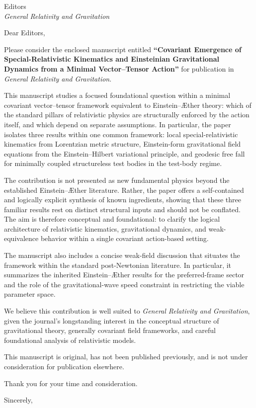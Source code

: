 \documentclass[a4paper,10pt]{letter}
\date{\today}
\begin{document}
    
    \begin{letter}{Editors\\
    \textit{General Relativity and Gravitation}}

        \opening{Dear Editors,}
        
        Please consider the enclosed manuscript entitled
        \textbf{“Covariant Emergence of Special-Relativistic Kinematics and Einsteinian Gravitational Dynamics from a Minimal Vector--Tensor Action”}
        for publication in \textit{General Relativity and Gravitation}.
        
        This manuscript studies a focused foundational question within a minimal covariant vector--tensor framework equivalent to Einstein--\AE{}ther theory: which of the standard pillars of relativistic physics are structurally enforced by the action itself, and which depend on separate assumptions. In particular, the paper isolates three results within one common framework: local special-relativistic kinematics from Lorentzian metric structure, Einstein-form gravitational field equations from the Einstein--Hilbert variational principle, and geodesic free fall for minimally coupled structureless test bodies in the test-body regime.
        
        The contribution is not presented as new fundamental physics beyond the established Einstein--\AE{}ther literature. Rather, the paper offers a self-contained and logically explicit synthesis of known ingredients, showing that these three familiar results rest on distinct structural inputs and should not be conflated. The aim is therefore conceptual and foundational: to clarify the logical architecture of relativistic kinematics, gravitational dynamics, and weak-equivalence behavior within a single covariant action-based setting.
        
        The manuscript also includes a concise weak-field discussion that situates the framework within the standard post-Newtonian literature. In particular, it summarizes the inherited Einstein--\AE{}ther results for the preferred-frame sector and the role of the gravitational-wave speed constraint in restricting the viable parameter space.
        
        We believe this contribution is well suited to \textit{General Relativity and Gravitation}, given the journal’s longstanding interest in the conceptual structure of gravitational theory, generally covariant field frameworks, and careful foundational analysis of relativistic models.
        
        This manuscript is original, has not been published previously, and is not under consideration for publication elsewhere.
        
        Thank you for your time and consideration.
        
        \closing{Sincerely,}
    
    \end{letter}
\end{document}
